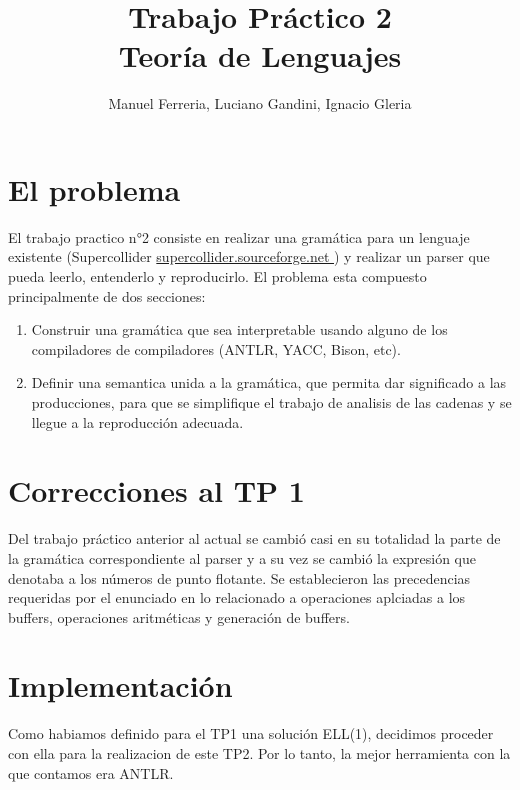 \documentclass[a4paper]{article}
\title{Trabajo Pr\'actico 2 \\ Teoría de Lenguajes}
\author{Manuel Ferreria, Luciano Gandini, Ignacio Gleria}
\begin{document}
\maketitle


\section{El problema}
El trabajo practico n°2 consiste en realizar una gram\'atica para un lenguaje
existente (Supercollider \url{supercollider.sourceforge.net }) y realizar un parser que pueda leerlo, entenderlo
y reproducirlo. El problema esta compuesto principalmente de dos secciones:
\begin{enumerate}
    \item Construir una gram\'atica que sea interpretable usando alguno de los
        compiladores de compiladores (ANTLR, YACC, Bison, etc).
    \item Definir una semantica unida a la gram\'atica, que permita dar significado
        a las producciones, para que se simplifique el trabajo de analisis de las
        cadenas y se llegue a la reproducci\'on adecuada.
\end{enumerate}

\section{Correcciones al TP 1}
Del trabajo pr\'actico anterior al actual se cambi\'o casi en su totalidad la 
parte de la gram\'atica correspondiente al parser y a su vez se cambi\'o la 
expresi\'on que denotaba a los n\'umeros de punto flotante. Se establecieron 
las precedencias requeridas por el enunciado en lo relacionado a operaciones 
aplciadas a los buffers, operaciones aritm\'eticas y generaci\'on de buffers.

\section{Implementaci\'on}
Como habiamos definido para el TP1 una soluci\'on ELL(1), decidimos proceder con
ella para la realizacion de este TP2. Por lo tanto, la mejor herramienta con la
que contamos era ANTLR. 
\end{document}

